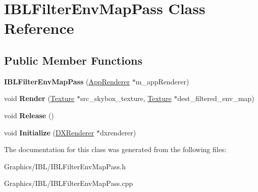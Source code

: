 \hypertarget{classIBLFilterEnvMapPass}{}\section{I\+B\+L\+Filter\+Env\+Map\+Pass Class Reference}
\label{classIBLFilterEnvMapPass}
\subsection*{Public Member Functions}
\begin{DoxyCompactItemize}
\item 
\mbox{\label{classIBLFilterEnvMapPass_aab440e8b0f0f9f7cfb83fdeba1c6f85b}} 
{\bfseries I\+B\+L\+Filter\+Env\+Map\+Pass} (\hyperlink{classAppRenderer}{App\+Renderer} $\ast$m\+\_\+app\+Renderer)
\item 
\mbox{\label{classIBLFilterEnvMapPass_a940ed8b865b9326a5a3071014cea0fbf}} 
void {\bfseries Render} (\hyperlink{classTexture}{Texture} $\ast$src\+\_\+skybox\+\_\+texture, \hyperlink{classTexture}{Texture} $\ast$dest\+\_\+filtered\+\_\+env\+\_\+map)
\item 
\mbox{\label{classIBLFilterEnvMapPass_a1eb28740028f9b17e37b60a60c55169a}} 
void {\bfseries Release} ()
\item 
\mbox{\label{classIBLFilterEnvMapPass_af97dd9339f7be21e74d0c77a735839fe}} 
void {\bfseries Initialize} (\hyperlink{classDXRenderer}{D\+X\+Renderer} $\ast$dxrenderer)
\end{DoxyCompactItemize}


The documentation for this class was generated from the following files\+:\begin{DoxyCompactItemize}
\item 
Graphics/\+I\+B\+L/I\+B\+L\+Filter\+Env\+Map\+Pass.\+h\item 
Graphics/\+I\+B\+L/I\+B\+L\+Filter\+Env\+Map\+Pass.\+cpp\end{DoxyCompactItemize}
